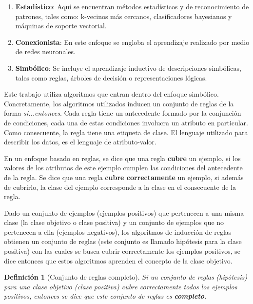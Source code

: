\documentclass[12pt]{report}
\theoremstyle{break}
\newtheorem{definicion}{Definición}[chapter]
\theoremstyle{break}
\begin{document}
\begin{enumerate}
\item \textbf{Estadístico}: Aquí se encuentran métodos estadísticos y de reconocimiento de patrones, tales como: k-vecinos más cercanos, clasificadores bayesianos y máquinas de soporte vectorial.

\item \textbf{Conexionista}: En este enfoque se engloba el aprendizaje realizado por medio de redes neuronales.

\item \textbf{Simbólico}: Se incluye el aprendizaje inductivo de descripciones simbólicas, tales como reglas, árboles de decisión o representaciones lógicas.
\end{enumerate}

Este trabajo utiliza algoritmos que entran dentro del enfoque simbólico. Concretamente, los algoritmos utilizados inducen un conjunto de reglas de la forma \textit{si...entonces}. Cada regla tiene un antecedente formado por la conjunción de condiciones, cada una de estas condiciones involucra un atributo en particular. Como consecuente, la regla tiene una etiqueta de clase. El lenguaje utilizado para describir los datos, es el lenguaje de atributo-valor.

En un enfoque basado en reglas, se dice que una regla \textbf{cubre} un ejemplo, si los valores de los atributos de este ejemplo cumplen las condiciones del antecedente de la regla. Se dice que una regla \textbf{cubre correctamente} un ejemplo, si además de cubrirlo, la clase del ejemplo corresponde a la clase en el consecuente de la regla.

Dado un conjunto de ejemplos (ejemplos positivos) que pertenecen a una misma clase (la clase objetivo o clase positiva) y un conjunto de ejemplos que no pertenecen a ella (ejemplos negativos), los algoritmos de inducción de reglas obtienen un conjunto de reglas (este conjunto es llamado hipótesis para la clase positiva) con las cuales se busca cubrir correctamente los ejemplos positivos, se dice entonces que estos algoritmos aprenden el concepto de la clase objetivo.

\begin{definicion}[Conjunto de reglas completo]
\label{definicion:reglas-completas}
Si un conjunto de reglas (hipótesis) para una clase objetivo (clase positiva) cubre correctamente todos los ejemplos positivos, entonces se dice que este conjunto de reglas es \textbf{completo}.
\end{definicion}
\end{document}
